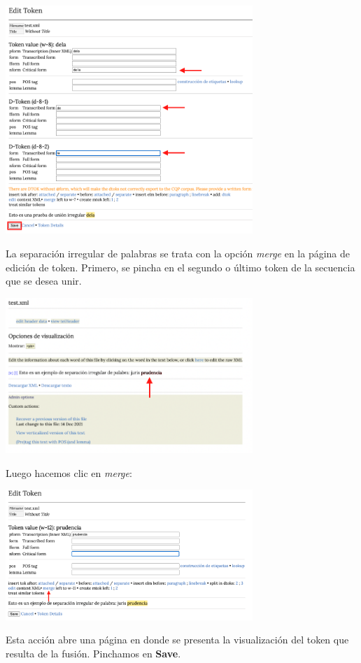 \documentclass[
]{book}
\begin{document}
\includegraphics[width=0.7\textwidth,height=\textheight]{img/dela2.png}

La separación irregular de palabras se trata con la opción \emph{merge} en la página de edición de token. Primero, se pincha en el segundo o último token de la secuencia que se desea unir.

\includegraphics[width=0.7\textwidth,height=\textheight]{img/separacion.png}

Luego hacemos clic en \emph{merge}:

\includegraphics[width=0.7\textwidth,height=\textheight]{img/separacion1.png}

Esta acción abre una página en donde se presenta la visualización del token que resulta de la fusión. Pinchamos en \textbf{Save}.
\end{document}
